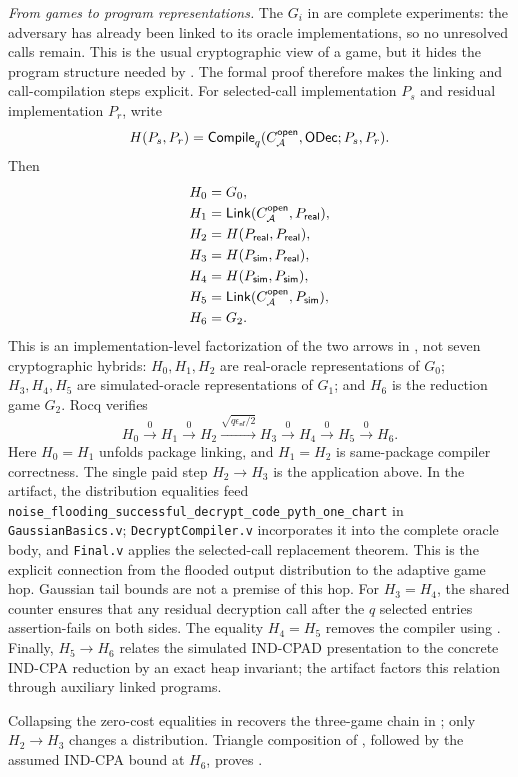 \smallskip\noindent\emph{From games to program representations.}
The \(G_i\) in  are complete experiments: the
adversary has already been linked to its oracle implementations, so no
unresolved calls remain.
This is the usual cryptographic view of a game, but it hides the program
structure needed by .
The formal proof therefore makes the linking and call-compilation steps
explicit.
For selected-call implementation \(P_s\) and residual implementation \(P_r\),
write
\[
 H(P_s,P_r)=
 \mathsf{Compile}_{q}
   (C_{\mathcal{A}}^{\mathsf{open}},\mathsf{ODec};P_s,P_r).
\]
Then
\begin{align*}
 H_0 &= G_0,\\
 H_1 &= \mathsf{Link}(C_{\mathcal{A}}^{\mathsf{open}},P_{\mathsf{real}}),\\
 H_2 &= H(P_{\mathsf{real}},P_{\mathsf{real}}),\\
 H_3 &= H(P_{\mathsf{sim}},P_{\mathsf{real}}),\\
 H_4 &= H(P_{\mathsf{sim}},P_{\mathsf{sim}}),\\
 H_5 &= \mathsf{Link}(C_{\mathcal{A}}^{\mathsf{open}},P_{\mathsf{sim}}),\\
 H_6 &= G_2.
\end{align*}
This is an implementation-level factorization of the two arrows in
, not seven cryptographic hybrids:
\(H_0,H_1,H_2\) are real-oracle representations of \(G_0\);
\(H_3,H_4,H_5\) are simulated-oracle representations of \(G_1\); and
\(H_6\) is the reduction game \(G_2\).
Rocq verifies
\begin{equation}
\label{eq:hybrid-chain}
 H_0\xrightarrow{0}H_1\xrightarrow{0}H_2
 \xrightarrow{\sqrt{q\epsilon_{\mathsf{nf}}/2}}H_3
 \xrightarrow{0}H_4\xrightarrow{0}H_5\xrightarrow{0}H_6.
\end{equation}
Here \(H_0=H_1\) unfolds package linking, and \(H_1=H_2\) is same-package
compiler correctness.
The single paid step \(H_2\to H_3\) is the application above.
In the artifact, the distribution equalities feed
\nolinkurl{noise_flooding_successful_decrypt_code_pyth_one_chart}
in \texttt{GaussianBasics.v}; \texttt{DecryptCompiler.v} incorporates it
into the complete oracle body, and \texttt{Final.v} applies the selected-call
replacement theorem.
This is the explicit connection from the flooded output distribution to the
adaptive game hop.  Gaussian tail bounds are not a premise of this hop.
For \(H_3=H_4\), the shared counter ensures that any residual decryption call
after the \(q\) selected entries assertion-fails on both sides.
The equality \(H_4=H_5\) removes the compiler using
.
Finally, \(H_5\to H_6\) relates the simulated IND-CPAD presentation to the
concrete IND-CPA reduction by an exact heap invariant; the artifact factors
this relation through auxiliary linked programs.

Collapsing the zero-cost equalities in  recovers the
three-game chain in ; only \(H_2\to H_3\)
changes a distribution.
Triangle composition of , followed by the assumed
IND-CPA bound at \(H_6\), proves .

